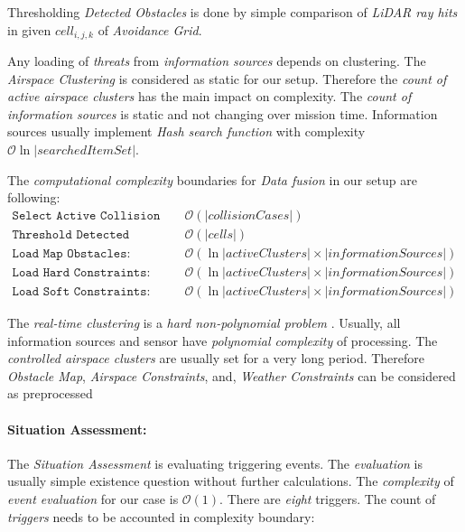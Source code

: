 Thresholding \emph{Detected Obstacles} is done by simple comparison of \emph{LiDAR ray hits} in given $cell_{i,j,k}$ of \emph{Avoidance Grid}.

Any loading of \emph{threats} from \emph{information sources} depends on clustering. The \emph{Airspace Clustering} is considered as static for our setup. Therefore the \emph{count of active airspace clusters} has the main impact on complexity. The \emph{count of information sources} is static and not changing over mission time. Information sources usually implement \emph{Hash search function} with complexity $\mathscr{O}\ln|searched Item Set|$.

\noindent The \emph{computational complexity} boundaries for \emph{Data fusion} in  our setup are following:
\begin{equation*}
    \begin{aligned}
        \texttt{Select Active Collision Cases: }& \mathscr{O} (|collision Cases|)\\
        \texttt{Threshold Detected Obstacles: }& \mathscr{O}(|cells|)\\
        \texttt{Load Map Obstacles: }& \mathscr{O}(\ln|activeClusters|\times|information Sources|)\\
        \texttt{Load Hard Constraints: }& \mathscr{O}(\ln|activeClusters|\times|information Sources|)\\
        \texttt{Load Soft Constraints: }& \mathscr{O}(\ln|activeClusters|\times|information Sources|)
    \end{aligned}
\end{equation*}

\begin{note}
    The \emph{real-time clustering} is a \emph{hard non-polynomial problem} \cite{kleinberg1998microeconomic}.  Usually, all information sources and sensor have \emph{polynomial complexity} of processing. The \emph{controlled airspace clusters} are usually set for a very long period. Therefore \emph{Obstacle Map}, \emph{Airspace Constraints}, and, \emph{Weather Constraints} can be considered as preprocessed
\end{note}

\newpage
\paragraph{Situation Assessment:} The \emph{Situation Assessment} is evaluating triggering events. The \emph{evaluation} is usually simple existence question without further calculations. The \emph{complexity} of \emph{event evaluation} for our case is $\mathscr{O}(1)$. There are \emph{eight} triggers. The count of \emph{triggers} needs to be accounted in complexity boundary:

